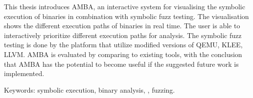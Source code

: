 This thesis introduces AMBA, an interactive system for visualising the symbolic execution of binaries in combination with symbolic fuzz testing.
The visualisation shows the different execution paths of binaries in real time.
The user is able to interactively prioritize different execution paths for analysis.
The symbolic fuzz testing is done by the \stoe{} platform that utilize modified versions of QEMU, KLEE, LLVM.
AMBA is evaluated by comparing to existing tools, with the conclusion that AMBA has the potential to become useful if the suggested future work is implemented.

Keywords: symbolic execution, binary analysis, \stoe{}, fuzzing.
